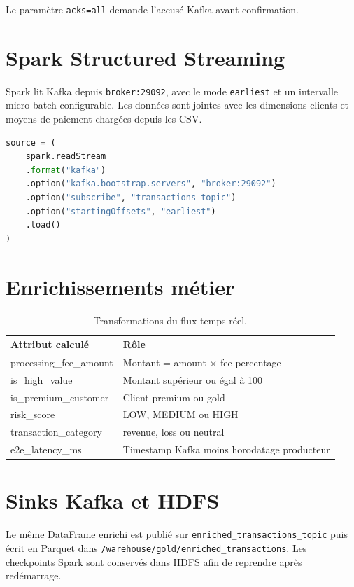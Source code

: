 \documentclass[11pt,a4paper]{report}
\begin{document}
Le paramètre \texttt{acks=all} demande l'accusé Kafka avant confirmation.

\section{Spark Structured Streaming}
Spark lit Kafka depuis \texttt{broker:29092}, avec le mode
\texttt{earliest} et un intervalle micro-batch configurable.
Les données sont jointes avec les dimensions clients et moyens de paiement
chargées depuis les CSV.

\begin{lstlisting}[language=Python,caption={Source Kafka du pipeline Streaming}]
source = (
    spark.readStream
    .format("kafka")
    .option("kafka.bootstrap.servers", "broker:29092")
    .option("subscribe", "transactions_topic")
    .option("startingOffsets", "earliest")
    .load()
)
\end{lstlisting}

\section{Enrichissements métier}
\begin{table}[H]
\centering
\begin{tabularx}{\textwidth}{l Y}
\toprule
\textbf{Attribut calculé} & \textbf{Rôle}\\
\midrule
processing\_fee\_amount & Montant = amount $\times$ fee percentage\\
is\_high\_value & Montant supérieur ou égal à 100\\
is\_premium\_customer & Client premium ou gold\\
risk\_score & LOW, MEDIUM ou HIGH\\
transaction\_category & revenue, loss ou neutral\\
e2e\_latency\_ms & Timestamp Kafka moins horodatage producteur\\
\bottomrule
\end{tabularx}
\caption{Transformations du flux temps réel.}
\end{table}

\section{Sinks Kafka et HDFS}
Le même DataFrame enrichi est publié sur
\texttt{enriched\_transactions\_topic} puis écrit en Parquet dans
\texttt{/warehouse/gold/enriched\_transactions}. Les checkpoints
Spark sont conservés dans HDFS afin de reprendre après redémarrage.
\end{document}

